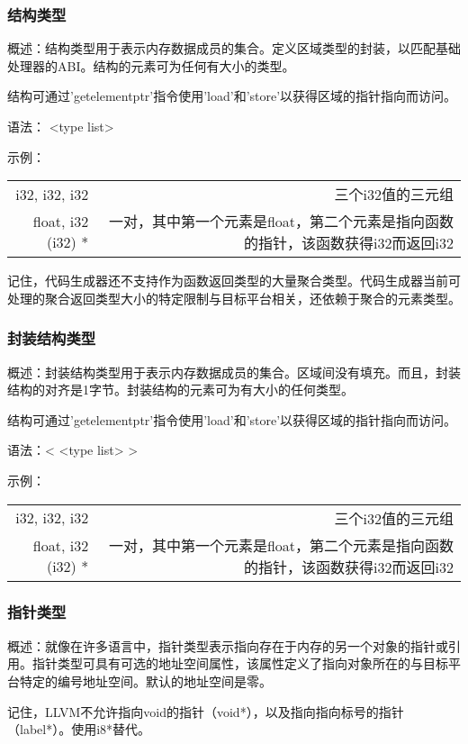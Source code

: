\documentclass[12pt,a4paper]{article}
\begin{document}
{\subsubsection{结构类型}

概述：结构类型用于表示内存数据成员的集合。定义区域类型的封装，以匹配基础处理器的ABI。结构的元素可为任何有大小的类型。

结构可通过'getelementptr'指令使用'load'和'store'以获得区域的指针指向而访问。

语法：{ <type list> }

示例：
\begin{tabular}{rr}
{ i32, i32, i32 } & 三个i32值的三元组 \\
{ float, i32 (i32) * } & 一对，其中第一个元素是float，第二个元素是指向函数的指针，该函数获得i32而返回i32 \\
\end{tabular}

记住，代码生成器还不支持作为函数返回类型的大量聚合类型。代码生成器当前可处理的聚合返回类型大小的特定限制与目标平台相关，还依赖于聚合的元素类型。

\subsubsection{封装结构类型}

概述：封装结构类型用于表示内存数据成员的集合。区域间没有填充。而且，封装结构的对齐是1字节。封装结构的元素可为有大小的任何类型。

结构可通过'getelementptr'指令使用'load'和'store'以获得区域的指针指向而访问。

语法：< { <type list> } >

示例：
\begin{tabular}{rr}
{ i32, i32, i32 } & 三个i32值的三元组 \\
{ float, i32 (i32) * } & 一对，其中第一个元素是float，第二个元素是指向函数的指针，该函数获得i32而返回i32 \\
\end{tabular}

\subsubsection{指针类型}

概述：就像在许多语言中，指针类型表示指向存在于内存的另一个对象的指针或引用。指针类型可具有可选的地址空间属性，该属性定义了指向对象所在的与目标平台特定的编号地址空间。默认的地址空间是零。

记住，LLVM不允许指向void的指针（void*），以及指向指向标号的指针（label*）。使用i8*替代。

}
\end{document}
